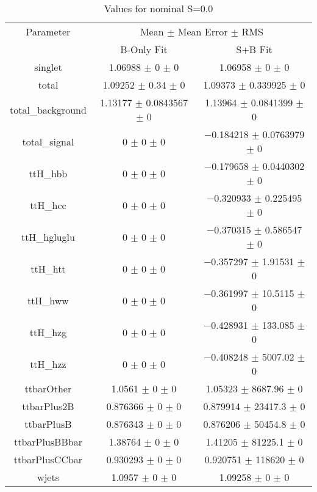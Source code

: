 \begin{table}
\centering
\caption{Values for nominal S=0.0}
\begin{tabular}{ccc}
\toprule
Parameter & \multicolumn{2}{c}{Mean $\pm$ Mean Error $\pm$ RMS}\\
 & B-Only Fit & S+B Fit\\
\midrule
singlet & \num{1.06988} $\pm$ \num{0} $\pm$ \num{0} & \num{1.06958} $\pm$ \num{0} $\pm$ \num{0}\\
total & \num{1.09252} $\pm$ \num{0.34} $\pm$ \num{0} & \num{1.09373} $\pm$ \num{0.339925} $\pm$ \num{0}\\
total\_background & \num{1.13177} $\pm$ \num{0.0843567} $\pm$ \num{0} & \num{1.13964} $\pm$ \num{0.0841399} $\pm$ \num{0}\\
total\_signal & \num{0} $\pm$ \num{0} $\pm$ \num{0} & \num{-0.184218} $\pm$ \num{0.0763979} $\pm$ \num{0}\\
ttH\_hbb & \num{0} $\pm$ \num{0} $\pm$ \num{0} & \num{-0.179658} $\pm$ \num{0.0440302} $\pm$ \num{0}\\
ttH\_hcc & \num{0} $\pm$ \num{0} $\pm$ \num{0} & \num{-0.320933} $\pm$ \num{0.225495} $\pm$ \num{0}\\
ttH\_hgluglu & \num{0} $\pm$ \num{0} $\pm$ \num{0} & \num{-0.370315} $\pm$ \num{0.586547} $\pm$ \num{0}\\
ttH\_htt & \num{0} $\pm$ \num{0} $\pm$ \num{0} & \num{-0.357297} $\pm$ \num{1.91531} $\pm$ \num{0}\\
ttH\_hww & \num{0} $\pm$ \num{0} $\pm$ \num{0} & \num{-0.361997} $\pm$ \num{10.5115} $\pm$ \num{0}\\
ttH\_hzg & \num{0} $\pm$ \num{0} $\pm$ \num{0} & \num{-0.428931} $\pm$ \num{133.085} $\pm$ \num{0}\\
ttH\_hzz & \num{0} $\pm$ \num{0} $\pm$ \num{0} & \num{-0.408248} $\pm$ \num{5007.02} $\pm$ \num{0}\\
ttbarOther & \num{1.0561} $\pm$ \num{0} $\pm$ \num{0} & \num{1.05323} $\pm$ \num{8687.96} $\pm$ \num{0}\\
ttbarPlus2B & \num{0.876366} $\pm$ \num{0} $\pm$ \num{0} & \num{0.879914} $\pm$ \num{23417.3} $\pm$ \num{0}\\
ttbarPlusB & \num{0.876343} $\pm$ \num{0} $\pm$ \num{0} & \num{0.876206} $\pm$ \num{50454.8} $\pm$ \num{0}\\
ttbarPlusBBbar & \num{1.38764} $\pm$ \num{0} $\pm$ \num{0} & \num{1.41205} $\pm$ \num{81225.1} $\pm$ \num{0}\\
ttbarPlusCCbar & \num{0.930293} $\pm$ \num{0} $\pm$ \num{0} & \num{0.920751} $\pm$ \num{118620} $\pm$ \num{0}\\
wjets & \num{1.0957} $\pm$ \num{0} $\pm$ \num{0} & \num{1.09258} $\pm$ \num{0} $\pm$ \num{0}\\
\bottomrule
\end{tabular}
\end{table}